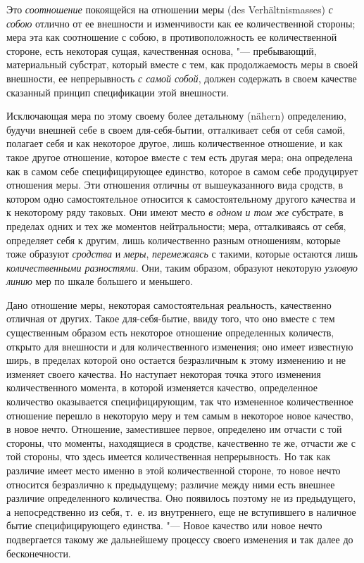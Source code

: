 Это {\em соотношение} покоящейся на отношении меры (des
Verhältnismasses) {\em с собою} отлично от ее внешности
и изменчивости как ее количественной стороны; мера эта как соотношение с
собою, в противоположность ее количественной стороне, есть некоторая сущая,
качественная основа, "--- пребывающий, материальный субстрат, который вместе с
тем, как продолжаемость меры в своей внешности, ее непрерывность
{\em с самой собой}, должен содержать в своем качестве
сказанный принцип спецификации этой внешности.

Исключающая мера по этому своему более детальному (nähern) определению,
будучи внешней себе в своем для-себя-бытии, отталкивает себя от себя самой,
полагает себя и как некоторое другое, лишь количественное отношение, и как
такое другое отношение, которое вместе с тем есть другая мера; она
определена как в самом себе специфицирующее единство, которое в самом себе
продуцирует отношения меры. Эти отношения отличны от вышеуказанного вида
сродств, в котором одно самостоятельное относится к самостоятельному
другого качества и к некоторому ряду таковых. Они имеют место
{\em в одном и том же} субстрате, в пределах одних и
тех же моментов нейтральности; мера, отталкиваясь от себя, определяет себя
к другим, лишь количественно разным отношениям, которые тоже образуют
{\em сродства} и {\em меры},
{\em перемежаясь} с такими, которые остаются лишь
{\em количественными разностями}. Они, таким образом,
образуют некоторую {\em узловую линию} мер по шкале
большего и меньшего.

Дано отношение меры, некоторая самостоятельная реальность, качественно
отличная от других. Такое для-себя-бытие, ввиду того, что оно вместе с тем
существенным образом есть некоторое отношение определенных количеств,
открыто для внешности и для количественного изменения; оно имеет известную
ширь, в пределах которой оно остается безразличным к этому изменению и не
изменяет своего качества. Но наступает некоторая точка этого изменения
количественного момента, в которой изменяется качество, определенное
количество оказывается специфицирующим, так что измененное количественное
отношение перешло в некоторую меру и тем самым в некоторое новое качество,
в новое нечто. Отношение, заместившее первое, определено им отчасти с той
стороны, что моменты, находящиеся в сродстве, качественно те же, отчасти же
с той стороны, что здесь имеется количественная непрерывность. Но так как
различие имеет место именно в этой количественной стороне, то новое нечто
относится безразлично к предыдущему; различие между ними есть внешнее
различие определенного количества. Оно появилось поэтому не из предыдущего,
а непосредственно из себя, т.~е. из внутреннего, еще не вступившего в
наличное бытие специфицирующего единства. "--- Новое качество или новое нечто
подвергается такому же дальнейшему процессу своего изменения и так далее до
бесконечности.

